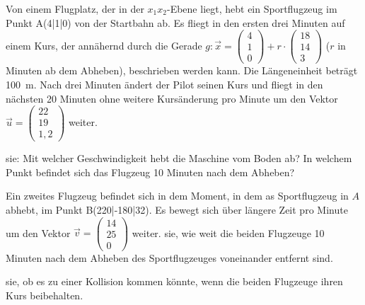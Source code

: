 \documentclass[11pt, a5paper, landscape]{scrartcl}
\begin{document}
\begin{aufgabe}\small
	Von einem Flugplatz, der in der $x_1x_2$-Ebene liegt, hebt ein Sportflugzeug im Punkt A\pkt(4|1|0) von der Startbahn ab. Es fliegt in den ersten drei Minuten auf einem Kurs, der annähernd durch die Gerade $g: \vec{x} = \begin{pmatrix} 4 \\ 1 \\ 0 \end{pmatrix} + r\cdot \begin{pmatrix} 18 \\ 14 \\ 3 \end{pmatrix}$ ($r$ in Minuten ab dem Abheben), beschrieben werden kann. Die Längeneinheit beträgt \SI{100}{\meter}. Nach drei Minuten ändert der Pilot seinen Kurs und fliegt in den nächsten 20 Minuten ohne weitere Kursänderung pro Minute um den Vektor $\vec{u} = \begin{pmatrix} 22 \\ 19 \\ 1,2 \end{pmatrix}$ weiter.
	
	\begin{teilaufgaben}
		\teilaufgabe {} sie: Mit welcher Geschwindigkeit hebt die Maschine vom Boden ab? In welchem Punkt befindet sich das Flugzeug 10 Minuten nach dem Abheben?
		
		\teilaufgabe Ein zweites Flugzeug befindet sich in dem Moment, in dem as Sportflugzeug in $A$ abhebt, im Punkt B\pkt(220|-180|32). Es bewegt sich über längere Zeit pro Minute um den Vektor $\vec{v} = \begin{pmatrix} 14 \\ 25 \\ 0 \end{pmatrix}$ weiter.  sie, wie weit die beiden Flugzeuge 10 Minuten nach dem Abheben des Sportflugzeuges voneinander entfernt sind.
		
		\teilaufgabe {} sie, ob es zu einer Kollision kommen könnte, wenn die beiden Flugzeuge ihren Kurs beibehalten.
	\end{teilaufgaben}
\end{aufgabe}
\clearpage
\end{document}
